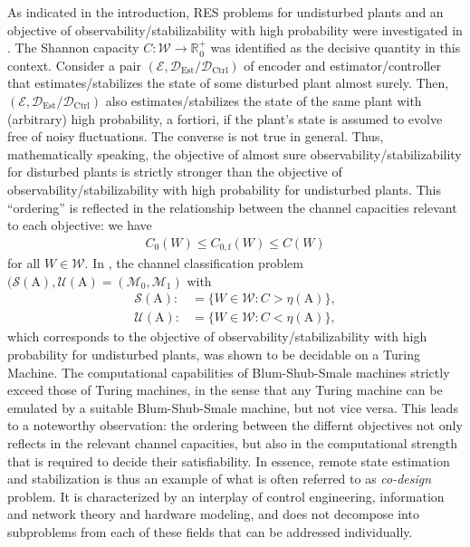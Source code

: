 \documentclass[conference]{IEEEtran}
\def\E{{\mathcal E}}
\def\D{{\mathcal D}}
\def\M{{\mathcal M}}
\def\W{{\mathcal W}}
\def\S{{\mathcal S}}
\def\U{{\mathcal U}}
\def\RR{{\mathbb R}}
\def\mA{\bm{\mathrm{A}}}
\newcommand{\De}{\D_{\text{Est}}}
\newcommand{\Dc}{\D_{\text{Ctrl}}}
\newcommand{\revision}[1]{}
\begin{document}
	As indicated in the introduction, RES problems for undisturbed plants and an objective of observability/stabilizability with
	high probability were investigated in \cite{MS07SC}. The Shannon capacity \(C : \W \rightarrow \RR_{\hspace{1pt}0}^{+}\) was identified as the decisive quantity in this context.
	Consider a pair \((\E,\De\text{/}\Dc)\) of encoder and estimator/controller that estimates/stabilizes the state of some disturbed plant almost surely.
	Then, \((\E,\De\text{/}\Dc)\) also estimates/stabilizes the state of the same plant with (arbitrary) high probability, a fortiori, if the plant's state is 
	assumed to evolve free of noisy fluctuations. The converse is not true in general. Thus, mathematically speaking, the objective of almost sure 
	observability/stabilizability for disturbed plants is strictly stronger than the objective of observability/stabilizability with high probability for 
	undisturbed plants. This ``ordering'' is reflected in the relationship between the channel capacities relevant to each objective: we have
	\begin{align}
		C_0(W) \leq C_{0,\mathrm{f}}(W) \leq C(W)
	\end{align}
	for all \(W\in\W\). In \cite{BoBoDe21TAC}, the channel classification problem \((\S(\mA),\U(\mA) = (\M_0,\M_1)\) with
	\begin{align}	\S(\mA) :&= \big\{ W \in \W : C > \eta(\mA)\big\}, \\
					\U(\mA) :&= \big\{ W \in \W : C < \eta(\mA)\big\},
	\end{align}
	which corresponds to the objective of observability/stabilizability with high probability for 
	undisturbed plants, was shown to be decidable on a Turing Machine. 
	\revision{As indicated in Section \ref{sec:PreliminariesBSS},} The computational
	capabilities of Blum-Shub-Smale machines strictly exceed those of Turing machines, in the sense that any Turing machine can be emulated by a suitable
	Blum-Shub-Smale machine, but not vice versa. This leads to a noteworthy observation: the ordering between the differnt objectives not only reflects 
	in the relevant channel capacities, but also in the computational strength that is required to decide their satisfiability. 
	In essence, remote state estimation and stabilization is thus an example of what is often referred to as \emph{co-design} problem. It is characterized by
	an interplay of control engineering, information and network theory and hardware modeling, and does not decompose into subproblems from each of these fields
	that can be addressed individually. 	
		



\end{document}
